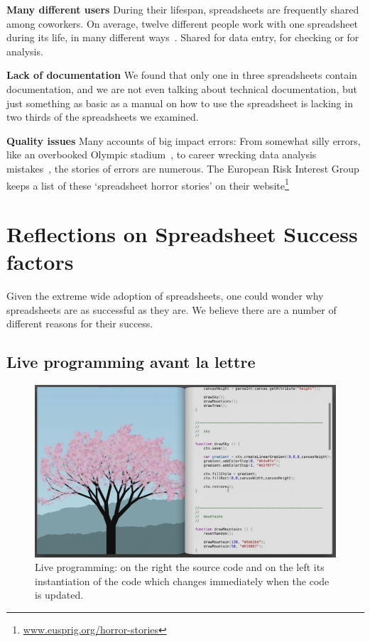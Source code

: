 \documentclass[conference]{IEEEtran}
\begin{document}
\textbf{Many different users} During their lifespan, spreadsheets are frequently shared among coworkers. On average, twelve different people work with one spreadsheet during its life, in many different ways~\cite{hermans_supporting_2011}. Shared for data entry, for checking or for analysis.

\textbf{Lack of documentation} We found that only one in three spreadsheets  contain documentation, and we are not even talking about technical documentation, but just something as basic as a manual on how to use the spreadsheet is lacking in two thirds of the spreadsheets we examined.

\textbf{Quality issues} Many accounts of big impact errors: From somewhat silly errors, like an overbooked Olympic stadium~\cite{Kelso2012}, to career wrecking data analysis mistakes~\cite{Herndon2014}, the stories of errors are numerous. The European Risk Interest Group keeps a list of these ‘spreadsheet horror stories’ on their website\footnote{\url{www.eusprig.org/horror-stories}}

\section{Reflections on Spreadsheet Success factors}
Given the extreme wide adoption of spreadsheets, one could wonder why spreadsheets are as successful as they are. We believe there are a number of different reasons for their success.

\subsection{Live programming avant la lettre}

\begin{figure}
  \begin{center}
  \includegraphics[width=\columnwidth]{fig/bret.png}
  \caption{Live programming: on the right the source code and on the left its instantiation of the code which changes immediately when the code is updated.}
  \label{fig:bret}
  \end{center}
\end{figure} 
\end{document}
